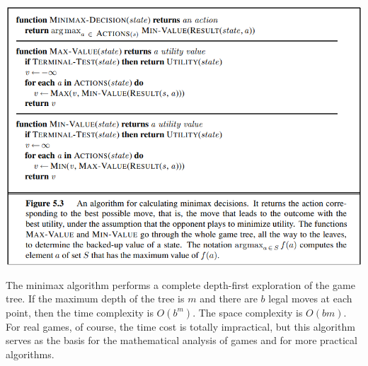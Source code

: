 \begin{center}
    \includegraphics[]{images/minimax-algorithms.png}
\end{center}
The minimax algorithm performs a complete depth-first exploration of the game tree. If the maximum depth of the tree is $m$ and there are $b$ legal moves at each point, then the time complexity is $O(b^m)$. The space complexity is $O(bm)$. For real games, of course, the time cost is totally impractical, but this algorithm serves as the basis for the mathematical analysis of games and for more practical algorithms.

